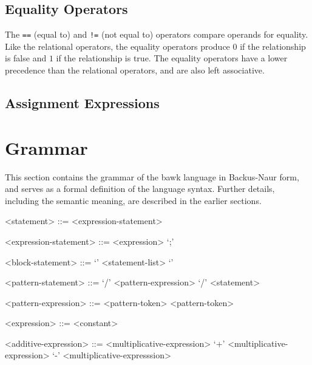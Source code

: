 \documentclass[letterpaper]{article}
\begin{document}
\subsection{Equality Operators}
The \texttt{==} (equal to) and \texttt{!=} (not equal to) operators compare operands for equality.  Like the relational operators, the equality operators produce $0$ if the relationship is false and $1$ if the relationship is true.  The equality operators have a lower precedence than the relational operators, and are also left associative.


\subsection{Assignment Expressions}




\section{Grammar}
This section contains the grammar of the bawk language in Backus-Naur form, and serves as a formal definition of the language syntax.  Further details, including the semantic meaning, are described in the earlier sections.
\begin{grammar}

<statement> ::= <expression-statement>

<expression-statement> ::= <expression> `;'

<block-statement> ::= `{' <statement-list> `}'

<pattern-statement> ::= `/' <pattern-expression> `/' <statement>

<pattern-expression> ::= <pattern-token>
 <pattern-token>


<expression> ::= <constant>

<additive-expression> ::= <multiplicative-expression>
 `+' <multiplicative-expression>
 `-' <multiplicative-expresssion>
\end{grammar}
\end{document}
